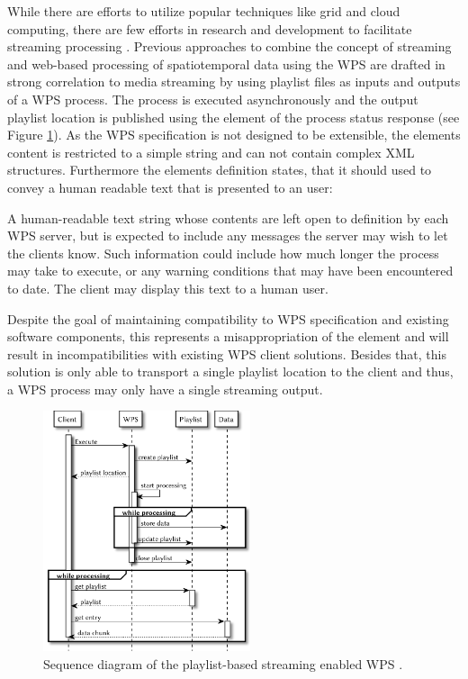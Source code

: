 	While there are efforts to utilize popular techniques like grid and cloud computing, there are few efforts in research and development to facilitate streaming processing \citep{foerster2012live}. Previous approaches to combine the concept of streaming and web-based processing of spatiotemporal data using the \ac{WPS} are drafted in strong correlation to media streaming \citep{foerster2012live} by using playlist files \citep{ietf:draft-pantos-http-live-streaming-12} as inputs and outputs of a \ac{WPS} process. The process is executed asynchronously and the output playlist location is published using the  element of the process status response (see Figure \ref{fig:sd:previous}). As the \ac{WPS} specification is not designed to be extensible, the elements content is restricted to a simple string and can not contain complex \ac{XML} structures. Furthermore the elements definition states, that it should used to convey a human readable text that is presented to an user:
	\begin{signedquote}{\cite{ogc:wps}}
		A human-readable text string whose contents are left open to definition by each WPS server, but is expected to include any messages the server may wish to let the clients know. Such information could include how much longer the process may take to execute, or any warning conditions that may have been encountered to date. The client may display this text to a human user.
	\end{signedquote}
	Despite the goal of maintaining compatibility to \ac{WPS} specification and existing software components, this represents a misappropriation of the element and will result in incompatibilities with existing \ac{WPS} client solutions. Besides that, this solution is only able to transport a single playlist location to the client and thus, a \ac{WPS} process may only have a single streaming output.

	\begin{figure}[!htb]
		\centering
		\includegraphics[width=0.54225352112676062\textwidth]{figures/sequence-diagramm-previous.pdf}
		\caption{\label{fig:sd:previous} Sequence diagram of the playlist-based streaming enabled WPS \citep{foerster2012live}.}
	\end{figure}

